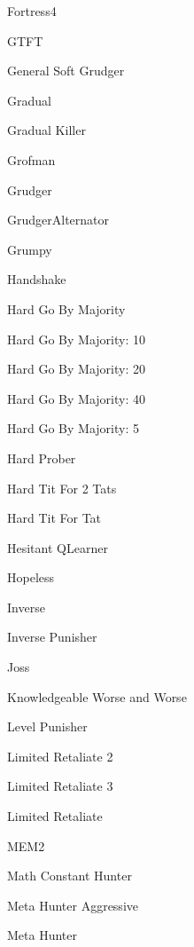 \item Fortress4~\cite{Ashlock2006}
\item GTFT \cite{Gaudesi2016, Nowak1993}
\item General Soft Grudger~\cite{axelrodproject}
\item Gradual~\cite{Beaufils1997}
\item Gradual Killer~\cite{prison}
\item Grofman\cite{Axelrod1980a}
\item Grudger~\cite{Axelrod1980a, Banks1990, Beaufils1997, Van2015, Li2011}
\item GrudgerAlternator~\cite{prison}
\item Grumpy~\cite{axelrodproject}
\item Handshake~\cite{Robson1990}
\item Hard Go By Majority~\cite{Mittal2009}
\item Hard Go By Majority: 10~\cite{axelrodproject}
\item Hard Go By Majority: 20~\cite{axelrodproject}
\item Hard Go By Majority: 40~\cite{axelrodproject}
\item Hard Go By Majority: 5~\cite{axelrodproject}
\item Hard Prober~\cite{prison}
\item Hard Tit For 2 Tats~\cite{Stewart2012}
\item Hard Tit For Tat~\cite{PD2017}
\item Hesitant QLearner\cite{axelrodproject}
\item Hopeless~\cite{Van2015}
\item Inverse~\cite{axelrodproject}
\item Inverse Punisher~\cite{axelrodproject}
\item Joss~\cite{Axelrod1980a, Stewart2012}
\item Knowledgeable Worse and Worse~\cite{axelrodproject}
\item Level Punisher~\cite{Eckhart2015}
\item Limited Retaliate 2~\cite{axelrodproject}
\item Limited Retaliate 3~\cite{axelrodproject}
\item Limited Retaliate~\cite{axelrodproject}
\item MEM2~\cite{Li20142}
\item Math Constant Hunter~\cite{axelrodproject}
\item Meta Hunter Aggressive~\cite{axelrodproject}
\item Meta Hunter~\cite{axelrodproject}
